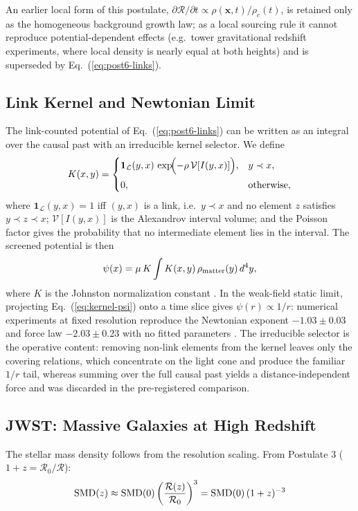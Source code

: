 \documentclass[12pt]{article}
\newcommand{\linkset}{\mathcal{L}}
\newcommand{\kernelop}{K}
\begin{document}
An earlier local form of this postulate, $\partial\mathcal{R}/\partial t \propto \rho(\mathbf{x},t)/\rho_c(t)$, is retained only as the homogeneous background growth law; as a local sourcing rule it cannot reproduce potential-dependent effects (e.g.\ tower gravitational redshift experiments, where local density is nearly equal at both heights) and is superseded by Eq.~(\ref{eq:post6-links}).

\subsection{Link Kernel and Newtonian Limit}
\label{sec:kernel}

The link-counted potential of Eq.~(\ref{eq:post6-links}) can be written as an integral over the causal past with an irreducible kernel selector. We define
\begin{equation}
\kernelop(x,y) =
\begin{cases}
\mathbf{1}_{\linkset}(y,x)\,\exp\!\Bigl(-\rho\,\mathcal{V}[I(y,x)]\Bigr), & y \prec x,\\[6pt]
0, & \text{otherwise},
\end{cases}
\label{eq:kernel-def}
\end{equation}
where $\mathbf{1}_{\linkset}(y,x)=1$ iff $(y,x)$ is a link, i.e.\ $y\prec x$ and no element $z$ satisfies $y\prec z\prec x$; $\mathcal{V}[I(y,x)]$ is the Alexandrov interval volume; and the Poisson factor gives the probability that no intermediate element lies in the interval. The screened potential is then
\begin{equation}
\psi(x) = \mu\,K \int \kernelop(x,y)\,\rho_{\rm matter}(y)\,d^4y,
\label{eq:kernel-psi}
\end{equation}
where $K$ is the Johnston normalization constant \citep{johnston2008}. In the weak-field static limit, projecting Eq.~(\ref{eq:kernel-psi}) onto a time slice gives $\psi(r)\propto 1/r$: numerical experiments at fixed resolution reproduce the Newtonian exponent $-1.03\pm0.03$ and force law $-2.03\pm0.23$ with no fitted parameters \citep{johnston2008,benincasa2010}. The irreducible selector is the operative content: removing non-link elements from the kernel leaves only the covering relations, which concentrate on the light cone and produce the familiar $1/r$ tail, whereas summing over the full causal past yields a distance-independent force and was discarded in the pre-registered comparison.

\subsection{JWST: Massive Galaxies at High Redshift}
The stellar mass density \citep{labbe2023,harvey2024,boylankolchin2023} follows from the resolution scaling. From Postulate 3 ($1+z = \mathcal{R}_0/\mathcal{R}$):
\begin{equation}
{\rm SMD}(z) \approx {\rm SMD}(0)
\left(\frac{\mathcal{R}(z)}{\mathcal{R}_0}\right)^3
= {\rm SMD}(0)\,(1+z)^{-3}
\label{eq:smd}
\end{equation}
\end{document}
